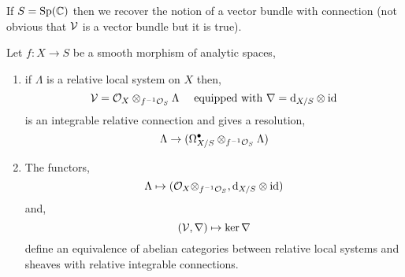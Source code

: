 \documentclass[12pt]{article}
\begin{document}
\begin{rmk}
If $S = \mathrm{Sp}(\mathbb{C})$ then we recover the notion of a vector bundle with connection (not obvious that $\mathcal{V}$ is a vector bundle but it is true).
\end{rmk}

\begin{thm}[relative RH]
Let $f : X \to S$ be a smooth morphism of analytic spaces,
\begin{enumerate}
\item if $\Lambda$ is a relative local system on $X$ then,
\[ \mathcal{V} = \mathcal{O}_{X} \otimes_{f^{-1} \mathcal{O}_{S}} \Lambda \quad \text{ equipped with } \nabla = \mathrm{d}_{X/S} \otimes \mathrm{id} \]
is an integrable relative connection and gives a resolution,
\[ \Lambda \to (\Omega_{X/S}^\bullet \otimes_{f^{-1} \mathcal{O}_{S}} \Lambda) \]

\item The functors,
\[ \Lambda \mapsto  (\mathcal{O}_{X} \otimes_{f^{-1} \mathcal{O}_{S}}, \mathrm{d}_{X/S} \otimes \mathrm{id}) \]
and,
\[ (\mathcal{V}, \nabla) \mapsto \ker{\nabla} \]
define an equivalence of abelian categories between relative local systems and sheaves with relative integrable connections.
\end{enumerate}
\end{thm}
\end{document}

